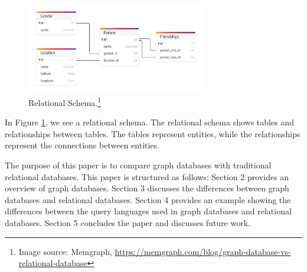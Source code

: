 \begin{figure}[ht]
    \centering
    \includegraphics[width=0.7\textwidth]{assets/memgraph-relational-schema.png}
    \caption{Relational Schema.\protect\footnote{Image source: Memgraph, \url{https://memgraph.com/blog/graph-database-vs-relational-database}}}
    \label{fig:relational_schema}
\end{figure}
In Figure \ref{fig:relational_schema}, we see a relational schema. The relational schema shows tables and relationships between tables. The tables represent entities, while the relationships represent the connections between entities.

The purpose of this paper is to compare graph databases with traditional relational databases. This paper is structured as follows: Section 2 provides an overview of graph databases. Section 3 discusses the differences between graph databases and relational databases. Section 4 provides an example showing the differences between the query languages used in graph databases and relational databases. Section 5 concludes the paper and discusses future work.










